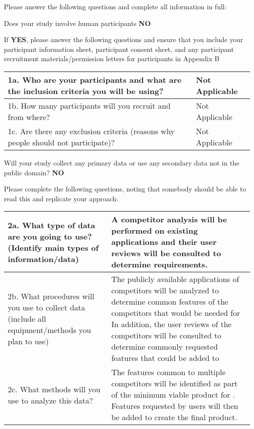 \documentclass[../CHEFCookingHelper.tex]{subfiles}
\begin{document}
Please answer the following questions and complete all information in full:

Does your study involve human participants \textbf{NO}


If \textbf{YES}, please answer the following questions and ensure that you include your participant
information sheet, participant consent sheet, and any participant recruitment materials/permission
letters for participants in Appendix B

\begin{table}[H]
    \begin{tabulary}{\textwidth}{|L|L|}
        \hline
        1a. Who are your participants and what are the inclusion criteria you will be using? & Not Applicable \\\hline
        1b. How many participants will you recruit and from where? & Not Applicable \\\hline
        1c. Are there any exclusion criteria (reasons why people should not participate)? & Not Applicable \\\hline
    \end{tabulary}
\end{table}

Will your study collect any primary data or use any secondary data not in the public domain? \textbf{NO}

Please complete the following questions, noting that somebody should be able to read this and replicate your approach:

\begin{table}[H]
    \begin{tabulary}{\textwidth}{|L|L|}
        \hline
        2a. What type of data are you going to use? (Identify main types of information/data)
            &
        A competitor analysis will be performed on existing applications and their user reviews will be consulted to determine requirements.
            \\\hline
        2b. What procedures will you use to collect data (include all equipment/methods you plan to use)
            &
        The publicly available applications of competitors will be analyzed to determine common features of the competitors that would be needed for \chef{}
        In addition, the user reviews of the competitors will be consulted to determine commonly requested features that could be added to \chef{}
            \\\hline
        2c. What methods will you use to analyze this data?
            &
        The features common to multiple competitors will be identified as part of the minimum viable product for \chef{}.
        Features requested by users will then be added to create the final product.
            \\\hline
    \end{tabulary}
\end{table}
\end{document}
